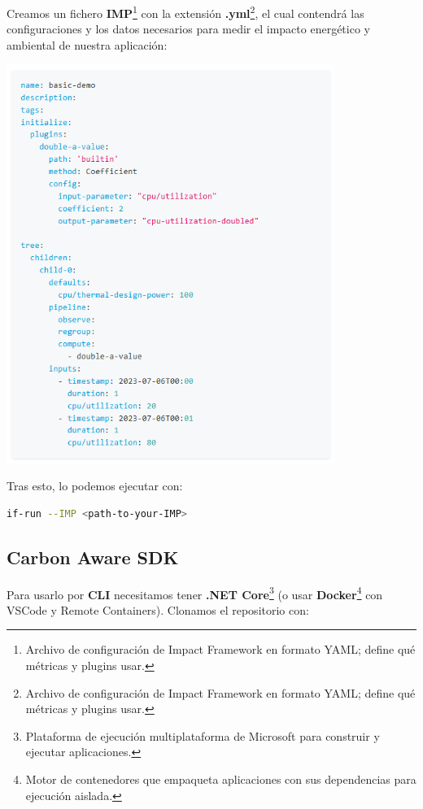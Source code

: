 \documentclass[12pt,a4paper]{report}
\begin{document}
Creamos un fichero \textbf{IMP}\footnote{Archivo de configuración de Impact
  Framework en formato YAML; define qué métricas y plugins usar.} con la
extensión \textbf{.yml}\footnote{Archivo de configuración de Impact Framework
  en formato YAML; define qué métricas y plugins usar.}, el cual contendrá las
configuraciones y los datos necesarios para medir el impacto energético y
ambiental de nuestra aplicación:

\begin{center}
  \includegraphics[width=0.8\textwidth]{imagenes/IF_1.png}
\end{center}

Tras esto, lo podemos ejecutar con:

\begin{tcolorbox}[colback=codebackground, colframe=codeborder, boxrule=0.8pt, arc=0mm, boxsep=5pt, left=5pt, right=5pt, top=5pt, bottom=5pt]
  \begin{lstlisting}[language=bash]
  if-run --IMP <path-to-your-IMP>
  \end{lstlisting}
\end{tcolorbox}

\subsection{Carbon Aware SDK}
Para usarlo por \textbf{CLI} necesitamos
tener \textbf{.NET Core}\footnote{Plataforma de ejecución multiplataforma de
  Microsoft para construir y ejecutar aplicaciones.} (o usar
\textbf{Docker}\footnote{Motor de contenedores que empaqueta aplicaciones con
  sus dependencias para ejecución aislada.} con VSCode y Remote Containers).
Clonamos el repositorio con:
\end{document}
